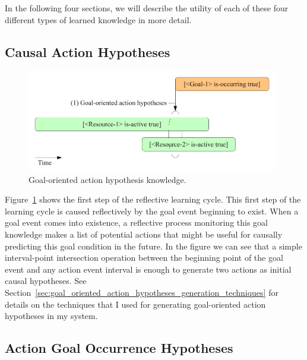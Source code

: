 In the following four sections, we will describe the utility of each
of these four different types of learned knowledge in more detail.

\subsection{Causal Action Hypotheses}
\label{sec:goal_oriented_action_hypotheses}

\begin{figure}[bth]
  \center
  \includegraphics[width=11cm]{gfx/learning_to_plan-1-goal_oriented_action_hypotheses}
  \caption[Goal-oriented action hypothesis knowledge]{Goal-oriented action hypothesis knowledge.}
  \label{fig:goal_oriented_action_hypotheses}
\end{figure}


Figure~\ref{fig:goal_oriented_action_hypotheses} shows the first step
of the reflective learning cycle.  This first step of the learning
cycle is caused reflectively by the goal event beginning to exist.
When a goal event comes into existence, a reflective process
monitoring this goal knowledge makes a list of potential actions that
might be useful for causally predicting this goal condition in the
future.  In the figure we can see that a simple interval-point
intersection operation between the beginning point of the goal event
and any action event interval is enough to generate two actions as
initial causal hypotheses.  See
Section~\ref{sec:goal_oriented_action_hypotheses_generation_techniques}
for details on the techniques that I used for generating goal-oriented
action hypotheses in my system.


\subsection{Action Goal Occurrence Hypotheses}

